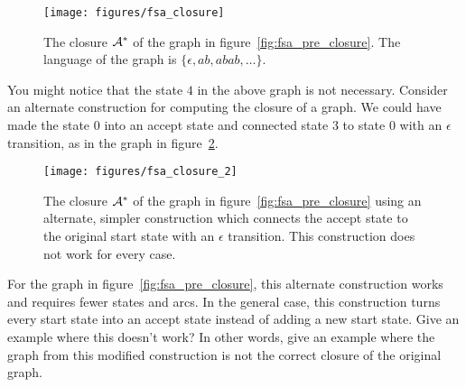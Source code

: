 \documentclass[main.tex]{subfiles}
\begin{document}
\begin{figure}
    \centering
    \texttt{[image: figures/fsa\_closure]}
    \caption{The closure $\mathcal{A}^*$ of the graph in
    figure~\ref{fig:fsa_pre_closure}. The language of the graph is $\{\epsilon,
    ab, abab, \ldots\}$.}
    \label{fig:fsa_closure}
\end{figure}

\begin{example}
You might notice that the state $4$ in the above graph is not necessary.
Consider an alternate construction for computing the closure of a graph. We
could have made the state $0$ into an accept state and connected state $3$
to state $0$ with an $\epsilon$ transition, as in the graph in
figure~\ref{fig:fsa_closure_2}.

\begin{figure}
    \centering
    \texttt{[image: figures/fsa\_closure\_2]}
    \caption{The closure $\mathcal{A}^*$ of the graph in
    figure~\ref{fig:fsa_pre_closure} using an alternate, simpler construction
    which connects the accept state to the original start state with an
    $\epsilon$ transition. This construction does not work for every case.}
    \label{fig:fsa_closure_2}
\end{figure}

For the graph in figure~\ref{fig:fsa_pre_closure}, this alternate construction
works and requires fewer states and arcs. In the general case, this
construction turns every start state into an accept state instead of adding
a new start state. Give an example where this doesn't work? In other words,
give an example where the graph from this modified construction is not the
correct closure of the original graph.
\end{example}
\end{document}
